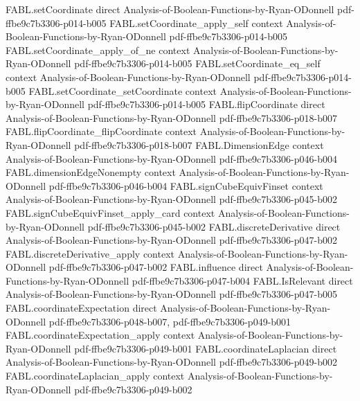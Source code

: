 \begin{theorem}
\proofstep
  {FABL.setCoordinate}
  {direct}
  {Analysis-of-Boolean-Functions-by-Ryan-ODonnell}
  {pdf-ffbe9c7b3306-p014-b005}
\proofstep
  {FABL.setCoordinate_apply_self}
  {context}
  {Analysis-of-Boolean-Functions-by-Ryan-ODonnell}
  {pdf-ffbe9c7b3306-p014-b005}
\proofstep
  {FABL.setCoordinate_apply_of_ne}
  {context}
  {Analysis-of-Boolean-Functions-by-Ryan-ODonnell}
  {pdf-ffbe9c7b3306-p014-b005}
\proofstep
  {FABL.setCoordinate_eq_self}
  {context}
  {Analysis-of-Boolean-Functions-by-Ryan-ODonnell}
  {pdf-ffbe9c7b3306-p014-b005}
\proofstep
  {FABL.setCoordinate_setCoordinate}
  {context}
  {Analysis-of-Boolean-Functions-by-Ryan-ODonnell}
  {pdf-ffbe9c7b3306-p014-b005}
\proofstep
  {FABL.flipCoordinate}
  {direct}
  {Analysis-of-Boolean-Functions-by-Ryan-ODonnell}
  {pdf-ffbe9c7b3306-p018-b007}
\proofstep
  {FABL.flipCoordinate_flipCoordinate}
  {context}
  {Analysis-of-Boolean-Functions-by-Ryan-ODonnell}
  {pdf-ffbe9c7b3306-p018-b007}
\proofstep
  {FABL.DimensionEdge}
  {context}
  {Analysis-of-Boolean-Functions-by-Ryan-ODonnell}
  {pdf-ffbe9c7b3306-p046-b004}
\proofstep
  {FABL.dimensionEdgeNonempty}
  {context}
  {Analysis-of-Boolean-Functions-by-Ryan-ODonnell}
  {pdf-ffbe9c7b3306-p046-b004}
\proofstep
  {FABL.signCubeEquivFinset}
  {context}
  {Analysis-of-Boolean-Functions-by-Ryan-ODonnell}
  {pdf-ffbe9c7b3306-p045-b002}
\proofstep
  {FABL.signCubeEquivFinset_apply_card}
  {context}
  {Analysis-of-Boolean-Functions-by-Ryan-ODonnell}
  {pdf-ffbe9c7b3306-p045-b002}
\proofstep
  {FABL.discreteDerivative}
  {direct}
  {Analysis-of-Boolean-Functions-by-Ryan-ODonnell}
  {pdf-ffbe9c7b3306-p047-b002}
\proofstep
  {FABL.discreteDerivative_apply}
  {context}
  {Analysis-of-Boolean-Functions-by-Ryan-ODonnell}
  {pdf-ffbe9c7b3306-p047-b002}
\proofstep
  {FABL.influence}
  {direct}
  {Analysis-of-Boolean-Functions-by-Ryan-ODonnell}
  {pdf-ffbe9c7b3306-p047-b004}
\proofstep
  {FABL.IsRelevant}
  {direct}
  {Analysis-of-Boolean-Functions-by-Ryan-ODonnell}
  {pdf-ffbe9c7b3306-p047-b005}
\proofstep
  {FABL.coordinateExpectation}
  {direct}
  {Analysis-of-Boolean-Functions-by-Ryan-ODonnell}
  {pdf-ffbe9c7b3306-p048-b007,
    pdf-ffbe9c7b3306-p049-b001}
\proofstep
  {FABL.coordinateExpectation_apply}
  {context}
  {Analysis-of-Boolean-Functions-by-Ryan-ODonnell}
  {pdf-ffbe9c7b3306-p049-b001}
\proofstep
  {FABL.coordinateLaplacian}
  {direct}
  {Analysis-of-Boolean-Functions-by-Ryan-ODonnell}
  {pdf-ffbe9c7b3306-p049-b002}
\proofstep
  {FABL.coordinateLaplacian_apply}
  {context}
  {Analysis-of-Boolean-Functions-by-Ryan-ODonnell}
  {pdf-ffbe9c7b3306-p049-b002}
\proofstep

\end{theorem}

